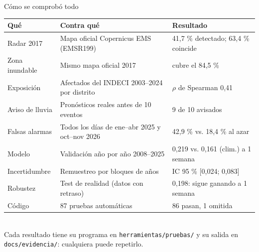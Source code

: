 \documentclass[aspectratio=169,11pt]{beamer}
\begin{document}
\begin{frame}{Cómo se comprobó todo}
\scriptsize
\begin{tabularx}{\textwidth}{@{}l X l@{}}\toprule
\textbf{Qué} & \textbf{Contra qué} & \textbf{Resultado}\\\midrule
Radar 2017 & Mapa oficial Copernicus EMS (EMSR199) & 41,7 \% detectado; 63,4 \% coincide\\
Zona inundable & Mismo mapa oficial 2017 & cubre el 84,5 \%\\
Exposición & Afectados del INDECI 2003–2024 por distrito & $\rho$ de Spearman 0,41\\
Aviso de lluvia & Pronósticos reales antes de 10 eventos & 9 de 10 avisados\\
Falsas alarmas & Todos los días de ene–abr 2025 y oct–nov 2026 & 42,9 \% vs. 18,4 \% al azar\\
Modelo & Validación año por año 2008–2025 & 0,219 vs. 0,161 (clim.) a 1 semana\\
Incertidumbre & Remuestreo por bloques de años & IC 95 \% [0,024; 0,083]\\
Robustez & Test de realidad (datos con retraso) & 0,198: sigue ganando a 1 semana\\
Código & 87 pruebas automáticas & 86 pasan, 1 omitida\\\bottomrule
\end{tabularx}\\[6pt]
\small Cada resultado tiene su programa en \texttt{herramientas/pruebas/} y su salida en \texttt{docs/evidencia/}: cualquiera puede repetirlo.
\end{frame}
\end{document}
